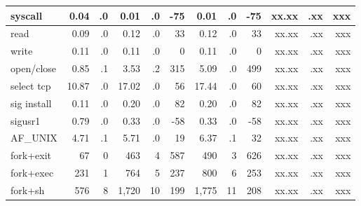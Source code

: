 \begin{table}[t!b!]
\begin{tabular}{|l|rr|rrr|rrr|rrr|}
syscall       &  0.04 & .0 &  0.01 & .0 & -75 &  0.01 & .0 & -75 & xx.xx & .xx & xxx \\\hline
read          &  0.09 & .0 &  0.12 & .0 &  33 &  0.12 & .0 &  33 & xx.xx & .xx & xxx \\\hline
write         &  0.11 & .0 &  0.11 & .0 &   0 &  0.11 & .0 &   0 & xx.xx & .xx & xxx \\\hline
open/close    &  0.85 & .1 &  3.53 & .2 & 315 &  5.09 & .0 & 499 & xx.xx & .xx & xxx \\\hline
select tcp    & 10.87 & .0 & 17.02 & .0 &  56 & 17.44 & .0 &  60 & xx.xx & .xx & xxx \\\hline
sig install   &  0.11 & .0 &  0.20 & .0 &  82 &  0.20 & .0 &  82 & xx.xx & .xx & xxx \\\hline
sigusr1       &  0.79 & .0 &  0.33 & .0 & -58 &  0.33 & .0 & -58 & xx.xx & .xx & xxx \\\hline
AF\_UNIX      &  4.71 & .1 &  5.71 & .0 &  19 &  6.37 & .1 &  32 & xx.xx & .xx & xxx \\\hline
\hline
fork+exit     &   67 &   0 &   463 &  4 & 587 &   490 &  3 & 626 & xx.xx & .xx & xxx \\\hline
fork+exec     &  231 &   1 &   764 &  5 & 237 &   800 &  6 & 253 & xx.xx & .xx & xxx \\\hline
fork+sh       &  576 &   8 & 1,720 & 10 & 199 & 1,775 & 11 & 208 & xx.xx & .xx & xxx \\\hline

\end{tabular}
\end{table}
